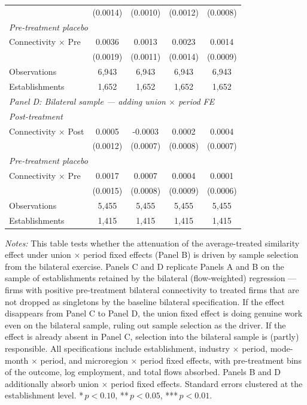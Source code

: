 \begin{table}[H]
\begin{tabular}{lcccc}
 & (0.0014) & (0.0010) & (0.0012) & (0.0008) \\
\multicolumn{5}{l}{\textit{Pre-treatment placebo}} \\
Connectivity $\times$ Pre & 0.0036 & 0.0013 & 0.0023 & 0.0014 \\
 & (0.0019) & (0.0011) & (0.0014) & (0.0009) \\
\hline
Observations &        6,943 &        6,943 &        6,943 &        6,943 \\
Establishments &        1,652 &        1,652 &        1,652 &        1,652 \\
\hline
\multicolumn{5}{l}{\textit{Panel D: Bilateral sample — adding union $\times$ period FE}} \\
\multicolumn{5}{l}{\textit{Post-treatment}} \\
Connectivity $\times$ Post & 0.0005 & -0.0003 & 0.0002 & 0.0004 \\
 & (0.0012) & (0.0007) & (0.0008) & (0.0007) \\
\multicolumn{5}{l}{\textit{Pre-treatment placebo}} \\
Connectivity $\times$ Pre & 0.0017 & 0.0007 & 0.0004 & 0.0001 \\
 & (0.0015) & (0.0008) & (0.0009) & (0.0006) \\
\hline
Observations &        5,455 &        5,455 &        5,455 &        5,455 \\
Establishments &        1,415 &        1,415 &        1,415 &        1,415 \\
\hline\hline
\end{tabular}
\begin{minipage}{\linewidth}
\smallskip
\scriptsize\textit{Notes:} This table tests whether the attenuation of the average-treated similarity effect under union $\times$ period fixed effects (Panel B) is driven by sample selection from the bilateral exercise. Panels C and D replicate Panels A and B on the sample of establishments retained by the bilateral (flow-weighted) regression — firms with positive pre-treatment bilateral connectivity to treated firms that are not dropped as singletons by the baseline bilateral specification. If the effect disappears from Panel C to Panel D, the union fixed effect is doing genuine work even on the bilateral sample, ruling out sample selection as the driver. If the effect is already absent in Panel C, selection into the bilateral sample is (partly) responsible. All specifications include establishment, industry $\times$ period, mode-month $\times$ period, and microregion $\times$ period fixed effects, with pre-treatment bins of the outcome, log employment, and total flows absorbed. Panels B and D additionally absorb union $\times$ period fixed effects. Standard errors clustered at the establishment level. *\,$p<0.10$, **\,$p<0.05$, ***\,$p<0.01$.
\end{minipage}
\end{table}

